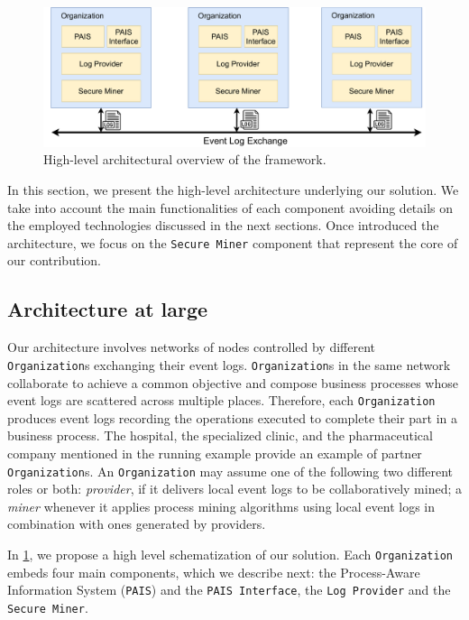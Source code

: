 \begin{figure}[t]
\centering
\includegraphics[width=13cm]{content/figures/architecture_diagram.pdf}
\caption{High-level architectural overview of the framework.}
\label{fig:architecture_diagram}
\end{figure}
In this section, we present the high-level architecture underlying our solution. We take into account the main functionalities of each component avoiding details on the employed technologies discussed in the next sections. Once introduced the architecture, we focus on the \texttt{Secure Miner} component that represent the core of our contribution.

\subsection{Architecture at large}
Our architecture involves networks of nodes controlled by different \texttt{Organization}s exchanging their event logs. \texttt{Organization}s in the same network collaborate to achieve a common objective and compose business processes whose event logs are scattered across multiple places. Therefore, each \texttt{Organization} produces event logs recording the operations executed to complete their part in a business process. The hospital, the specialized clinic, and the pharmaceutical company mentioned in the running example provide an example of partner \texttt{Organization}s. An \texttt{Organization} may assume one of the following two different roles or both: \textit{provider}, if it delivers local event logs to be collaboratively mined; a \textit{miner} whenever it applies process mining algorithms using local event logs in combination with ones generated by providers. %

In \cref{fig:architecture_diagram}, we propose a high level schematization of our solution. Each \texttt{Organization} embeds four main components, which we describe next: the Process-Aware Information System (\texttt{PAIS}) and the \texttt{PAIS Interface}, the \texttt{Log Provider} and the \texttt{Secure Miner}.



